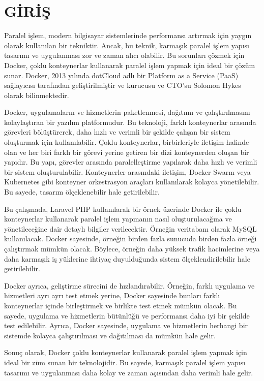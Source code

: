 \section{GİRİŞ}


Paralel işlem, modern bilgisayar sistemlerinde performansı artırmak için yaygın olarak kullanılan bir tekniktir. Ancak, bu teknik, karmaşık paralel işlem yapısı tasarımı ve uygulanması zor ve zaman alıcı olabilir. Bu sorunları çözmek için Docker, çoklu konteynerlar kullanarak paralel işlem yapmak için ideal bir çözüm sunar. Docker, 2013 yılında dotCloud adlı bir Platform as a Service (PaaS) sağlayıcısı tarafından geliştirilmiştir ve kurucusu ve CTO’su Solomon Hykes olarak bilinmektedir.

Docker, uygulamaların ve hizmetlerin paketlenmesi, dağıtımı ve çalıştırılmasını kolaylaştıran bir yazılım platformudur. Bu teknoloji, farklı konteynerlar arasında görevleri bölüştürerek, daha hızlı ve verimli bir şekilde çalışan bir sistem oluşturmak için kullanılabilir. Çoklu konteynerlar, birbirleriyle iletişim halinde olan ve her biri farklı bir görevi yerine getiren bir dizi konteynerden oluşan bir yapıdır. Bu yapı, görevler arasında paralelleştirme yapılarak daha hızlı ve verimli bir sistem oluşturulabilir. Konteynerler arasındaki iletişim, Docker Swarm veya Kubernetes gibi konteyner orkestrasyon araçları kullanılarak kolayca yönetilebilir. Bu sayede, tasarım ölçeklenebilir hale getirilebilir.

Bu çalışmada, Laravel PHP kullanılarak bir örnek üzerinde Docker ile çoklu konteynerlar kullanarak paralel işlem yapmanın nasıl oluşturulacağına ve yönetileceğine dair detaylı bilgiler verilecektir. Örneğin veritabanı olarak MySQL kullanılacak. Docker sayesinde, örneğin birden fazla sunucuda birden fazla örneği çalıştırmak mümkün olacak. Böylece, örneğin daha yüksek trafik hacimlerine veya daha karmaşık iş yüklerine ihtiyaç duyulduğunda sistem ölçeklendirilebilir hale getirilebilir.

Docker ayrıca, geliştirme sürecini de hızlandırabilir. Örneğin, farklı uygulama ve hizmetleri ayrı ayrı test etmek yerine, Docker sayesinde bunları farklı konteynerlar içinde birleştirmek ve birlikte test etmek mümkün olacak. Bu sayede, uygulama ve hizmetlerin bütünlüğü ve performansı daha iyi bir şekilde test edilebilir. Ayrıca, Docker sayesinde, uygulama ve hizmetlerin herhangi bir sistemde kolayca çalıştırılması ve dağıtılması da mümkün hale gelir.

Sonuç olarak, Docker çoklu konteynerlar kullanarak paralel işlem yapmak için ideal bir  züm sunan bir teknolojidir. Bu sayede, karmaşık paralel işlem yapısı tasarımı ve uygulanması daha kolay ve zaman açısından daha verimli hale gelir.

